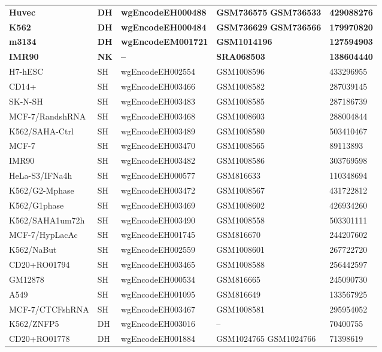 \begin{longtable}{p{3.5cm}p{1.2cm}p{3.7cm}p{2.5cm}p{2.8cm}}
\textbf{Huvec} & \textbf{DH} & \textbf{wgEncodeEH000488} & \textbf{GSM736575} \newline \textbf{GSM736533} & \textbf{429088276} \\
\textbf{K562} & \textbf{DH} & \textbf{wgEncodeEH000484} & \textbf{GSM736629} \newline \textbf{GSM736566} & \textbf{179970820} \\
\textbf{m3134} & \textbf{DH} & \textbf{wgEncodeEM001721} & \textbf{GSM1014196} & \textbf{127594903} \\
\textbf{IMR90} & \textbf{NK} & \textbf{--}    & \textbf{SRA068503} & \textbf{138604440} \\
H7-hESC & SH & wgEncodeEH002554 & GSM1008596 & 433296955 \\
CD14+ & SH & wgEncodeEH003466 & GSM1008582 & 287039145 \\
SK-N-SH & SH & wgEncodeEH003483 & GSM1008585 & 287186739 \\
MCF-7/RandshRNA & SH & wgEncodeEH003468 & GSM1008603 & 288004844 \\
K562/SAHA-Ctrl & SH & wgEncodeEH003489 & GSM1008580 & 503410467 \\
MCF-7 & SH & wgEncodeEH003470 & GSM1008565 & 89113893 \\
IMR90 & SH & wgEncodeEH003482 & GSM1008586 & 303769598 \\
HeLa-S3/IFNa4h & SH & wgEncodeEH000577 & GSM816633 & 110348694 \\
K562/G2-Mphase & SH & wgEncodeEH003472 & GSM1008567 & 431722812 \\
K562/G1phase & SH & wgEncodeEH003469 & GSM1008602 & 426934260 \\
K562/SAHA1um72h & SH & wgEncodeEH003490 & GSM1008558 & 503301111 \\
MCF-7/HypLacAc & SH & wgEncodeEH001745 & GSM816670 & 244207602 \\
K562/NaBut & SH & wgEncodeEH002559 & GSM1008601 & 267722720 \\
CD20+RO01794 & SH & wgEncodeEH003465 & GSM1008588 & 256442597 \\
GM12878 & SH & wgEncodeEH000534 & GSM816665 & 245090730 \\
A549 & SH & wgEncodeEH001095 & GSM816649 & 133567925 \\
MCF-7/CTCFshRNA & SH & wgEncodeEH003467 & GSM1008581 & 295954052 \\
K562/ZNFP5 & DH & wgEncodeEH003016 & -- & 70400755 \\
CD20+RO01778 & DH & wgEncodeEH001884 & GSM1024765 \newline GSM1024766 & 71398619 \\

\end{longtable}
